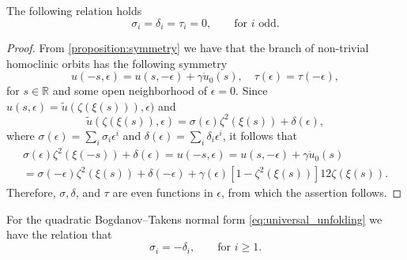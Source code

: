 \begin{corollary}
\label{corollary:delta_i_sigma_i}
The following relation holds
\[
\sigma_i = \delta_i = \tau_i = 0, \qquad \text{for $i$ odd}.
\]
\end{corollary}
\begin{proof}
From \cref{proposition:symmetry} we have that the branch of non-trivial
homoclinic orbits has the following symmetry
\[
u(-s, \epsilon)=u(s, -\epsilon)
    + \gamma \dot u_0(s),
\quad \tau(\epsilon) = \tau(-\epsilon),
\]
for $s \in \mathbb{R}$ and some open neighborhood of $\epsilon=0$.  Since
$u(s, \epsilon) = \tilde u(\zeta(\xi(s))), \epsilon)$ and
\begin{equation*}
    \tilde u(\zeta(\xi(s)), \epsilon) = \sigma(\epsilon) \zeta^2(\xi(s)) +
    \delta(\epsilon),
\end{equation*}
where $\sigma(\epsilon) = \sum_i \sigma_i \epsilon^i$ and $\delta(\epsilon) =
\sum_i \delta_i \epsilon^i$, it follows that
\begin{multline*}
    \sigma(\epsilon) \zeta^2(\xi(-s)) + \delta(\epsilon) = u(-s, \epsilon)
    = u(s, -\epsilon) + \gamma \dot u_0(s) \\
    = \sigma(-\epsilon) \zeta^2(\xi(s)) + \delta(-\epsilon)
    + \gamma(\epsilon) \left[1-\zeta^2(\xi(s))\right] 12 \zeta(\xi(s)).
\end{multline*}
Therefore, $\sigma, \delta$, and $\tau$ are even functions in $\epsilon$, from
which the assertion follows.
\end{proof}


\begin{corollary}
    \label{corollary:quadraticBTsigma_delta_relation}
    For the quadratic Bogdanov--Takens normal form \cref{eq:universal_unfolding}
    we have the relation that 
    \begin{equation}
        \label{eq:relation_sigma_delta}
        \sigma_i = -\delta_i, \qquad \text{for } i\geq 1.
    \end{equation}
\end{corollary}

